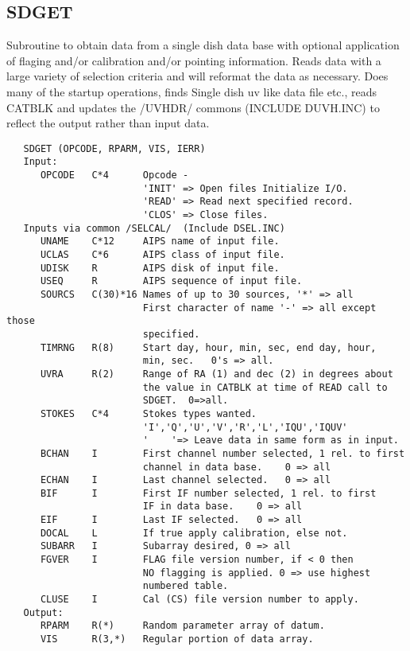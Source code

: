 \subsection{SDGET}
Subroutine to obtain data from a single dish data base with
optional application of flaging and/or calibration and/or pointing
information.  Reads data with a large variety of selection criteria
and will reformat the data as necessary.  Does many of the startup
operations, finds Single dish uv like data file etc., reads CATBLK
and updates the /UVHDR/ commons (INCLUDE DUVH.INC) to reflect the
output rather than input data.
\begin{verbatim}
   SDGET (OPCODE, RPARM, VIS, IERR)
   Input:
      OPCODE   C*4      Opcode -
                        'INIT' => Open files Initialize I/O.
                        'READ' => Read next specified record.
                        'CLOS' => Close files.
   Inputs via common /SELCAL/  (Include DSEL.INC)
      UNAME    C*12     AIPS name of input file.
      UCLAS    C*6      AIPS class of input file.
      UDISK    R        AIPS disk of input file.
      USEQ     R        AIPS sequence of input file.
      SOURCS   C(30)*16 Names of up to 30 sources, '*' => all
                        First character of name '-' => all except those
                        specified.
      TIMRNG   R(8)     Start day, hour, min, sec, end day, hour,
                        min, sec.   0's => all.
      UVRA     R(2)     Range of RA (1) and dec (2) in degrees about
                        the value in CATBLK at time of READ call to
                        SDGET.  0=>all.
      STOKES   C*4      Stokes types wanted.
                        'I','Q','U','V','R','L','IQU','IQUV'
                        '    '=> Leave data in same form as in input.
      BCHAN    I        First channel number selected, 1 rel. to first
                        channel in data base.    0 => all
      ECHAN    I        Last channel selected.   0 => all
      BIF      I        First IF number selected, 1 rel. to first
                        IF in data base.    0 => all
      EIF      I        Last IF selected.   0 => all
      DOCAL    L        If true apply calibration, else not.
      SUBARR   I        Subarray desired, 0 => all
      FGVER    I        FLAG file version number, if < 0 then
                        NO flagging is applied. 0 => use highest
                        numbered table.
      CLUSE    I        Cal (CS) file version number to apply.
   Output:
      RPARM    R(*)     Random parameter array of datum.
      VIS      R(3,*)   Regular portion of data array.

\end{verbatim}
